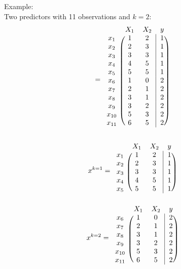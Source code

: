 \documentclass[12pt,a4paper]{article}%
\theoremstyle{definition}
\theoremstyle{plain}
\numberwithin{equation}{section}
\begin{document}
\begin{oframed}
Example: \\
Two predictors with 11 observations and $k=2$:
\begin{equation*}
[x^{T},y] = 
\begin{blockarray}{cccc}
   & X_{1} & X_{2} & y  \\
\begin{block}{c(cc|c)}
  x_{1} & 1 & 2 & 1 \\
  x_{2} & 2 & 3 & 1 \\
  x_{3} & 3 & 3 & 1 \\
  x_{4} & 4 & 5 & 1 \\
  x_{5} & 5 & 5 & 1 \\
  x_{6} & 1 & 0 & 2 \\
  x_{7} & 2 & 1 & 2 \\
  x_{8} & 3 & 1 & 2 \\
  x_{9} & 3 & 2 & 2 \\
  x_{10} & 5 & 3 & 2 \\
  x_{11} & 6 & 5 & 2 \\
\end{block}
\end{blockarray}
\end{equation*}

\begin{multicols}{2}
\begin{equation*}
x^{k=1} = \begin{blockarray}{cccc}
   & X_{1} & X_{2} & y  \\
\begin{block}{c(cc|c)}
  x_{1} & 1 & 2 & 1 \\
  x_{2} & 2 & 3 & 1 \\
  x_{3} & 3 & 3 & 1 \\
  x_{4} & 4 & 5 & 1 \\
  x_{5} & 5 & 5 & 1 \\
\end{block}
\end{blockarray}
\end{equation*}
\begin{equation*}
x^{k=2} = \begin{blockarray}{cccc}
   & X_{1} & X_{2} & y  \\
\begin{block}{c(cc|c)}
  x_{6} & 1 & 0 & 2 \\
  x_{7} & 2 & 1 & 2 \\
  x_{8} & 3 & 1 & 2 \\
  x_{9} & 3 & 2 & 2 \\
  x_{10} & 5 & 3 & 2 \\
  x_{11} & 6 & 5 & 2 \\
\end{block}
\end{blockarray}
\end{equation*}
\end{multicols}


\end{oframed}
\end{document}
